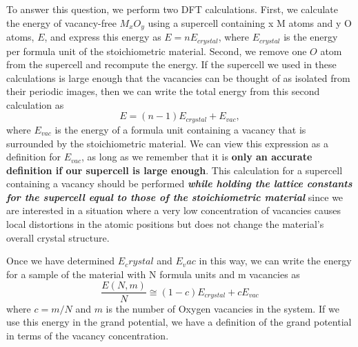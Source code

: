 \documentclass[12pt]{article}
\begin{document}
To answer this question, we perform two DFT calculations. First, we calculate the energy of vacancy-free $M_xO_y$ using a supercell containing x M atoms and y O atoms, $E$, and express this energy as $E = nE_{crystal}$, where $E_{crystal}$ is the energy per formula unit of the stoichiometric material. Second, we remove one $O$ atom from the supercell and recompute the energy. If the supercell we used in these calculations is large enough that the vacancies can be thought of as isolated from their periodic images, then we can write the total energy from this second calculation as 
\begin{equation}
    E = (n-1)E_{crystal} + E_{vac},
\end{equation} 
where $E_{vac}$ is the energy of a formula unit containing a vacancy that is surrounded by the stoichiometric material. We can view this expression as a definition for $E_{vac}$, as long as we remember that it is \textbf{only an accurate definition if our supercell is large enough}. This calculation for a supercell containing a vacancy should be performed \textbf{\textit{while holding the lattice constants for the supercell equal to those of the stoichiometric material}} since we are interested in a situation where a very low concentration of vacancies causes local distortions in the atomic positions but does not change the material’s overall crystal structure.

Once we have determined $E_crystal$ and $E_vac$ in this way, we can write the energy for a sample of the material with N formula units and m vacancies as
\begin{equation}
    \frac{E(N, m)}{N}\cong(1-c)E_{crystal}+cE_{vac}
\end{equation}
where $c=m/N$ and $m$ is the number of Oxygen vacancies in the system. If we use this energy in the grand potential, we have a definition of the grand potential in terms of the vacancy concentration.
\end{document}
